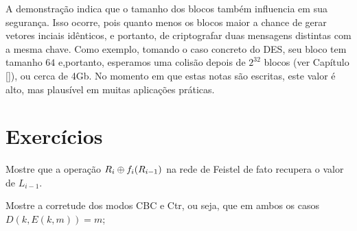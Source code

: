 A demonstração indica que o tamanho dos blocos também influencia em sua segurança.
Isso ocorre, pois quanto menos os blocos maior a chance de gerar vetores inciais idênticos, e portanto, de criptografar duas mensagens distintas com a mesma chave.
Como exemplo, tomando o caso concreto do DES, seu bloco tem tamanho $64$ e,portanto, esperamos uma colisão depois de $2^{32}$ blocos (ver Capítulo \ref{}), ou cerca de 4Gb.
No momento em que estas notas são escritas, este valor é alto, mas plausível em muitas aplicações práticas.

\section{Exercícios}
\label{sec:exercicios}

\begin{exercicio}
Mostre que a operação $R_i \oplus f_i(R_{i-1})$ na rede de Feistel de fato recupera o valor de $L_{i-1}$.
\end{exercicio}

\begin{exercicio}
  Mostre a corretude dos modos CBC e Ctr, ou seja, que em ambos os casos $D(k, E(k,m)) = m$;
\end{exercicio}
